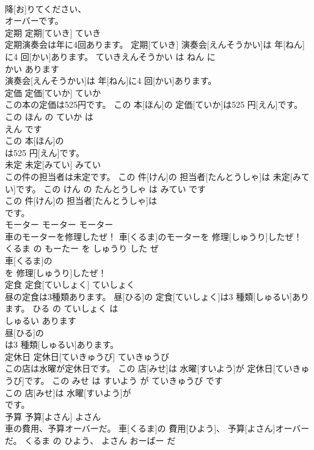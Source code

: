 \documentclass[8pt]{extreport}
\begin{document}
\begin{CJK}{UTF8}{min}
\\	降[お]りてください、
\\	オーバーです。			
\\	定期	定期[ていき]	ていき	
\\	定期演奏会は年に4回あります。	定期[ていき] 演奏会[えんそうかい]は 年[ねん]に4 回[かい]あります。	ていきえんそうかい は ねん に 
\\	かい あります	
\\	演奏会[えんそうかい]は 年[ねん]に4 回[かい]あります。			
\\	定価	定価[ていか]	ていか	
\\	この本の定価は525円です。	この 本[ほん]の 定価[ていか]は525 円[えん]です。	この ほん の ていか は 
\\	えん です	
\\	この 本[ほん]の
\\	は525 円[えん]です。			
\\	未定	未定[みてい]	みてい	
\\	この件の担当者は未定です。	この 件[けん]の 担当者[たんとうしゃ]は 未定[みてい]です。	この けん の たんとうしゃ は みてい です	
\\	この 件[けん]の 担当者[たんとうしゃ]は
\\	です。			
\\	モーター	モーター	モーター	
\\	車のモーターを修理したぜ！	車[くるま]のモーターを 修理[しゅうり]したぜ！	くるま の もーたー を しゅうり した ぜ	
\\	車[くるま]の
\\	を 修理[しゅうり]したぜ！			
\\	定食	定食[ていしょく]	ていしょく	
\\	昼の定食は3種類あります。	昼[ひる]の 定食[ていしょく]は3 種類[しゅるい]あります。	ひる の ていしょく は 
\\	しゅるい あります	
\\	昼[ひる]の
\\	は3 種類[しゅるい]あります。			
\\	定休日	定休日[ていきゅうび]	ていきゅうび	
\\	この店は水曜が定休日です。	この 店[みせ]は 水曜[すいよう]が 定休日[ていきゅうび]です。	この みせ は すいよう が ていきゅうび です	
\\	この 店[みせ]は 水曜[すいよう]が
\\	です。			
\\	予算	予算[よさん]	よさん	
\\	車の費用、予算オーバーだ。	車[くるま]の 費用[ひよう]、 予算[よさん]オーバーだ。	くるま の ひよう、 よさん おーばー だ	

\end{CJK}
\end{document}
